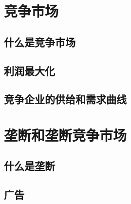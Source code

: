 \documentclass[12pt,a4paper]{article}
\begin{document}
\newpage
\section{竞争市场}

\subsection{什么是竞争市场}

\subsection{利润最大化}

\subsection{竞争企业的供给和需求曲线}

\newpage
\section{垄断和垄断竞争市场}

\subsection{什么是垄断}


\subsection{广告}
\end{document}

